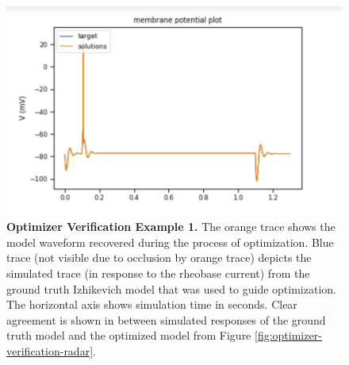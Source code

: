 \begin{figure}
    \centering
    \includegraphics[scale=0.85]{figures/simulated_data_supra_threshold.png}
    \caption[Optimizer Verification Example 1]{\textbf{Optimizer Verification Example 1.} The orange trace shows the model waveform recovered during the process of optimization.
    Blue trace (not visible due to occlusion by orange trace) depicts the simulated trace (in response to the rheobase current) from the ground truth Izhikevich model that was used to guide optimization.
    The horizontal axis shows simulation time in seconds.
    Clear agreement is shown in between simulated responses of the ground truth model and the optimized model from Figure \ref{fig:optimizer-verification-radar}. 
}
\label{fig:optimizer-verification-traces-1}
\end{figure}

